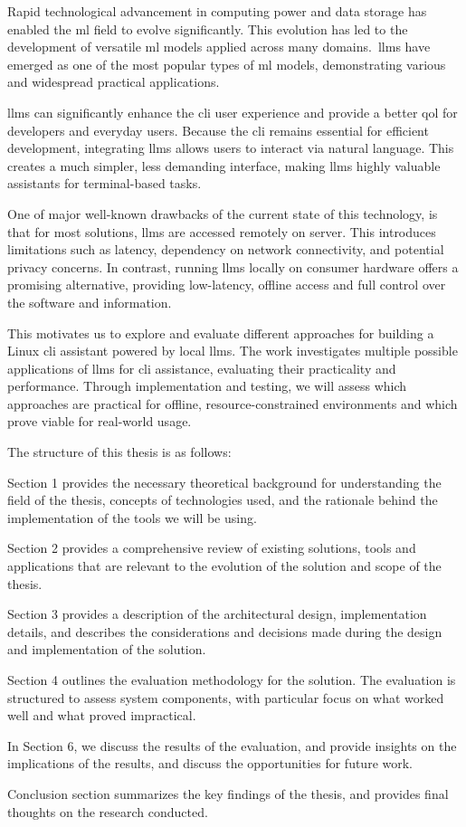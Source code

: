 Rapid technological advancement in computing power and data storage has enabled
the \gls{ml} field to evolve significantly. This evolution has led to the
development of versatile \gls{ml} models applied across many domains.\
\glspl{llm} have emerged as one of the most popular types of \gls{ml} models,
demonstrating various and widespread practical applications.

\glspl{llm} can significantly enhance the \gls{cli} user experience and
provide a better \gls{qol} for developers and everyday users. Because the
\gls{cli} remains essential for efficient development, integrating \glspl{llm}
allows users to interact via natural language. This creates a much simpler, less
demanding interface, making \glspl{llm} highly valuable assistants for
terminal-based tasks.

One of major well-known drawbacks of the current state of this technology, is
that for most solutions, \glspl{llm} are accessed remotely on server. This
introduces limitations such as latency, dependency on network connectivity, and
potential privacy concerns. In contrast, running \glspl{llm} locally on consumer
hardware offers a promising alternative, providing low-latency, offline access
and full control over the software and information.

This motivates us to explore and evaluate different approaches for building a
Linux \gls{cli} assistant powered by local \glspl{llm}. The work investigates
multiple possible applications of \glspl{llm} for \gls{cli} assistance,
evaluating their practicality and performance. Through implementation and
testing, we will assess which approaches are practical for offline,
resource-constrained environments and which prove viable for real-world usage.

The structure of this thesis is as follows:

Section 1 provides the necessary theoretical background for understanding the
field of the thesis, concepts of technologies used, and the rationale behind the
implementation of the tools we will be using.

Section 2 provides a comprehensive review of existing solutions, tools and
applications that are relevant to the evolution of the solution and scope of the
thesis.

Section 3 provides a description of the architectural design, implementation
details, and describes the considerations and decisions made during the design
and implementation of the solution.

Section 4 outlines the evaluation methodology for the solution. The
evaluation is structured to assess system components, with particular focus on
what worked well and what proved impractical.

In Section 6, we discuss the results of the evaluation, and provide insights
on the implications of the results, and discuss the opportunities for future
work.

Conclusion section summarizes the key findings of the thesis, and provides final
thoughts on the research conducted.
